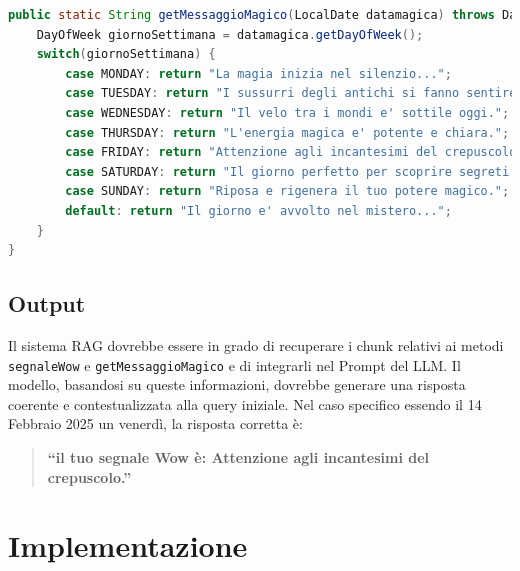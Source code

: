 \documentclass[12pt,a4paper,openright,twoside]{book}
\begin{document}
\begin{lstlisting}[language=Java, caption={Metodo getMessaggioMagico in DateUtilCustom.java}, label={lst:getMessaggioMagico}]
public static String getMessaggioMagico(LocalDate datamagica) throws DateTimeParseException {
    DayOfWeek giornoSettimana = datamagica.getDayOfWeek();
    switch(giornoSettimana) {
        case MONDAY: return "La magia inizia nel silenzio...";
        case TUESDAY: return "I sussurri degli antichi si fanno sentire.";
        case WEDNESDAY: return "Il velo tra i mondi e' sottile oggi.";
        case THURSDAY: return "L'energia magica e' potente e chiara.";
        case FRIDAY: return "Attenzione agli incantesimi del crepuscolo.";
        case SATURDAY: return "Il giorno perfetto per scoprire segreti nascosti.";
        case SUNDAY: return "Riposa e rigenera il tuo potere magico.";
        default: return "Il giorno e' avvolto nel mistero...";
    }
}
\end{lstlisting}

\subsection{Output}
Il sistema RAG dovrebbe essere in grado di recuperare i chunk relativi ai metodi \texttt{segnaleWow} e \texttt{getMessaggioMagico} e di integrarli nel Prompt del LLM.
Il modello, basandosi su queste informazioni, dovrebbe generare una risposta coerente e contestualizzata alla query iniziale.
Nel caso specifico essendo il 14 Febbraio 2025 un venerdì,  la risposta corretta è:
\begin{quote}
    \textbf{``il tuo segnale Wow è: Attenzione agli incantesimi del crepuscolo.''}
\end{quote}
\section{Implementazione}
\end{document}
